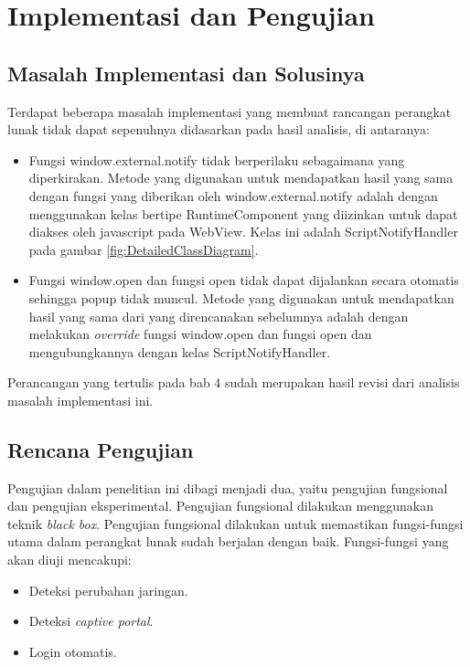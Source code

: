 \chapter{Implementasi dan Pengujian}
\label{chap:implementasi_pengujian}



\section{Masalah Implementasi dan Solusinya}
\label{sec:masalah_implementasi}

Terdapat beberapa masalah implementasi yang membuat rancangan perangkat lunak tidak dapat sepenuhnya didasarkan pada hasil analisis, di antaranya:

\begin{itemize}
    \item{Fungsi window.external.notify tidak berperilaku sebagaimana yang diperkirakan. Metode yang digunakan untuk mendapatkan hasil yang sama dengan fungsi yang diberikan oleh window.external.notify adalah dengan menggunakan kelas bertipe RuntimeComponent yang diizinkan untuk dapat diakses oleh javascript pada WebView. Kelas ini adalah ScriptNotifyHandler pada gambar \ref{fig:DetailedClassDiagram}.}
    \item{Fungsi window.open dan fungsi open tidak dapat dijalankan secara otomatis sehingga popup tidak muncul. Metode yang digunakan untuk mendapatkan hasil yang sama dari yang direncanakan sebelumnya adalah dengan melakukan \textit{override} fungsi window.open dan fungsi open dan mengubungkannya dengan kelas ScriptNotifyHandler.}
\end{itemize}

Perancangan yang tertulis pada bab 4 sudah merupakan hasil revisi dari analisis masalah implementasi ini.



\section{Rencana Pengujian}
\label{sec:rencana_pengujian}

Pengujian dalam penelitian ini dibagi menjadi dua, yaitu pengujian fungsional dan pengujian eksperimental. Pengujian fungsional dilakukan menggunakan teknik \textit{black box}. Pengujian fungsional dilakukan untuk memastikan fungsi-fungsi utama dalam perangkat lunak sudah berjalan dengan baik. Fungsi-fungsi yang akan diuji mencakupi:

\begin{itemize}
    \item{Deteksi perubahan jaringan.}
    \item{Deteksi \textit{captive portal}.}
    \item{Login otomatis.}
\end{itemize}


